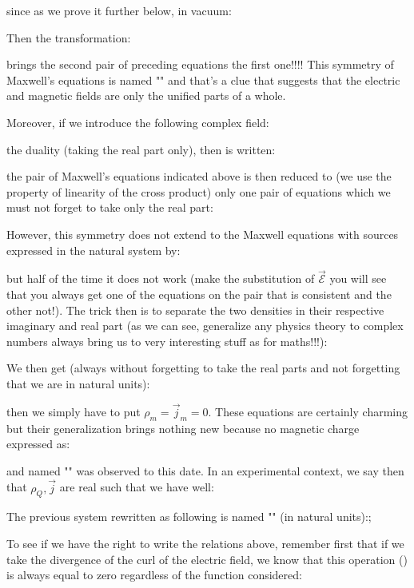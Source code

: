 	since as we prove it further below, in vacuum:
	
	Then the transformation:
	
	brings the second pair of preceding equations the first one!!!! This symmetry of Maxwell's equations is named "" and that's a clue that suggests that the electric and magnetic fields are only the unified parts of a whole.
	
	Moreover, if we introduce the following complex field:
	
	the duality (taking the real part only), then is written:
	
	the pair of Maxwell's equations indicated above is then reduced to (we use the property of linearity of the cross product) only one pair of equations which we must not forget to take only the real part:
	
	However, this symmetry does not extend to the Maxwell equations with sources expressed in the natural system by:
	
	but half of the time it does not work (make the substitution of $\vec{\mathcal{E}}$ you will see that you always get one of the equations on the pair that is consistent and the other not!). The trick then is to separate the two densities in their respective imaginary and real part (as we can see, generalize any physics theory to complex numbers always bring us to very interesting stuff as for maths!!!):
	
	We then get (always without forgetting to take the real parts and not forgetting that we are in natural units):
	
	then we simply have to put $\rho_m=\vec{j}_m=0$. These equations are certainly charming but their generalization brings nothing new because no magnetic charge expressed as:
	
	and named "" was observed to this date. In an experimental context, we say then that $\rho_Q,\vec{j}$ are real such that we have well:
	
	The previous system rewritten as following is named "" (in natural units):;
	
	To see if we have the right to write the relations above, remember first that if we take the divergence of the curl of the electric field, we know that this operation () is always equal to zero regardless of the function considered:
	
